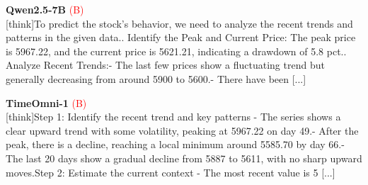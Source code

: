 \noindent
\begin{minipage}[t]{0.28\textwidth}
\colorbox{red!8}{\parbox{\dimexpr\textwidth-2\fboxsep}{
\textbf{Qwen2.5-7B} \textcolor{red}{(B)} \\[2pt]
\tiny
[think]\newline To predict the stock's behavior, we need to analyze the recent trends and patterns in the given data.. Identify the Peak and Current Price: The peak price is 5967.22, and the current price is 5621.21, indicating a drawdown of 5.8 pct.. Analyze Recent Trends:\newline    - The last few prices show a fluctuating trend but generally decreasing from around 5900 to 5600.\newline    - There have been [...]
}}
\end{minipage}
\hfill
\begin{minipage}[t]{0.28\textwidth}
\colorbox{red!8}{\parbox{\dimexpr\textwidth-2\fboxsep}{
\textbf{TimeOmni-1} \textcolor{red}{(B)} \\[2pt]
\tiny
[think]\newline Step 1: Identify the recent trend and key patterns  \newline - The series shows a clear upward trend with some volatility, peaking at 5967.22 on day 49.\newline - After the peak, there is a decline, reaching a local minimum around 5585.70 by day 66.\newline - The last 20 days show a gradual decline from  5887 to  5611, with no sharp upward moves.\newline Step 2: Estimate the current context  \newline - The most recent value is 5 [...]
}}
\end{minipage}
\hfill
